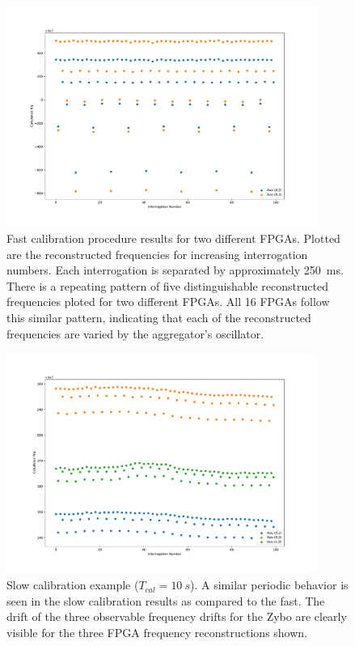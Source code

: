 \begin{figure}[]
\centering
\includegraphics[width=0.9\textwidth]{images/fast_example.pdf}
\caption{Fast calibration procedure results for two different FPGAs.
Plotted are the reconstructed frequencies for increasing interrogation numbers.
Each interrogation is separated by approximately 250~\unit{ms}.
There is a repeating pattern of five distinguishable reconstructed frequencies ploted for two different FPGAs.
All 16 FPGAs follow this similar pattern, indicating that each of the reconstructed frequencies are varied by the aggregator's oscillator.
}
\label{fig:fast_example}
\end{figure}

\begin{figure}[]
\centering
\includegraphics[width=0.9\textwidth]{images/slow_example.pdf}
\caption{Slow calibration example ($T_{cal} = 10~\unit{s}$).
A similar periodic behavior is seen in the slow calibration results as compared to the fast.
The drift of the three observable frequency drifts for the Zybo are clearly visible for the three FPGA frequency reconstructions shown. 
}
\end{figure}

